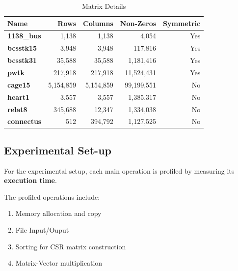 \documentclass[conference]{IEEEtran}
\begin{document}
        \begin{table}[ht]
            \caption{Matrix Details}
            \label{tab:matrix_details}
            \centering
            \begin{adjustbox}{width=\columnwidth}
            \begin{tabular}{lrrrr}
            \toprule
            \textbf{Name} & \textbf{Rows} & \textbf{Columns} & \textbf{Non-Zeros} & \textbf{Symmetric} \\
            \midrule
                \textbf{1138\_bus} & 1,138 & 1,138 & 4,054 & Yes \\
                \textbf{bcsstk15} & 3,948 & 3,948 & 117,816 & Yes \\
                \textbf{bcsstk31} & 35,588 & 35,588 & 1,181,416 & Yes \\
                \textbf{pwtk} & 217,918 & 217,918 & 11,524,431 & Yes \\
                \textbf{cage15} & 5,154,859 & 5,154,859 & 99,199,551 & No \\
                \textbf{heart1} & 3,557 & 3,557 & 1,385,317 & No \\
                \textbf{relat8} & 345,688 & 12,347 & 1,334,038 & No \\
                \textbf{connectus} & 512 & 394,792 & 1,127,525 & No \\
            \bottomrule
            \end{tabular}
            \end{adjustbox}
        \end{table}

        \subsection{Experimental Set-up}

        For the experimental setup, each main operation is profiled by
        measuring its \textbf{execution time}.
        
        The profiled operations include:
        \begin{enumerate}
            \item Memory allocation and copy
            \item File Input/Ouput
            \item Sorting for CSR matrix construction
            \item Matrix-Vector multiplication
        \end{enumerate}
\end{document}
